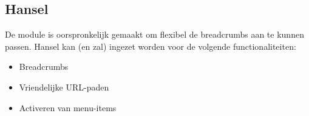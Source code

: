 \subsection{Hansel}

De module  is oorspronkelijk gemaakt om flexibel de breadcrumbs aan te kunnen passen. Hansel kan (en zal) ingezet worden voor de volgende functionaliteiten:
\begin{itemize}
\item Breadcrumbs
\item Vriendelijke URL-paden
\item Activeren van menu-items
\end{itemize}
